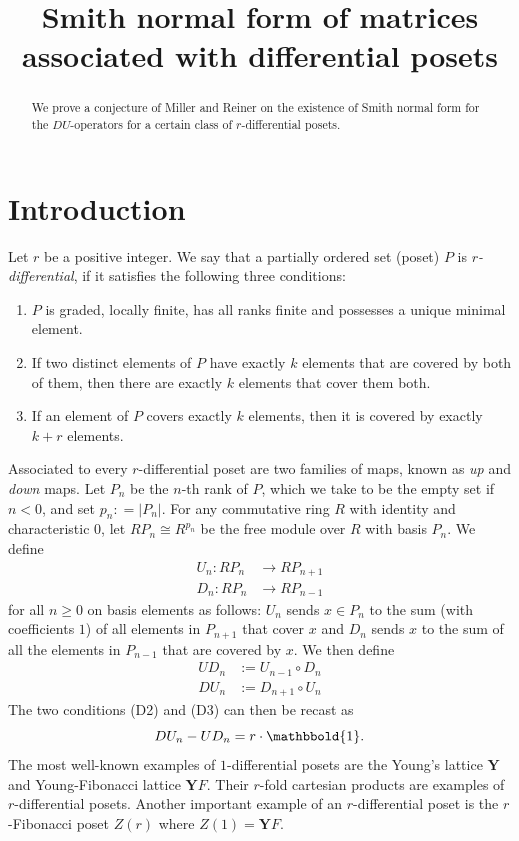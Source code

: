 \documentclass[ALCO, Unicode]{cedram}
\title
[Smith normal form for differential posets]
{Smith normal form of matrices associated with differential posets}
\author[\initial{S. W. A.} Shah]{\firstname{Syed Waqar Ali} \lastname{Shah}}
\begin{document}
\begin{abstract}
We prove a conjecture of Miller and Reiner on the existence of Smith normal form for the  $DU$-operators for a certain class of $r$-differential posets. 
\end{abstract}


\maketitle

\section{Introduction}           
Let $r$ be a positive integer. We say that a partially ordered     set (poset) $ P $ is \emph{$ r$-differential}, if it satisfies the following three conditions:    
\begin{enumerate} 
\item[(D1)]$P$ is graded, locally finite, has all ranks finite and possesses a unique minimal element.    
\item[(D2)]If two distinct elements of $P$ have exactly $k$ elements
that are covered by both of them, then there are  exactly $k$ elements
that cover them both.      
\item[(D3)] If an element of $P$ covers exactly  $k$ elements, then it is covered by exactly $k+r$  elements.                                             
\end{enumerate}
Associated to every $ r $-differential poset are two families of maps, known as \textit{up} and \textit{down} maps. Let $ P_{n} $ be the $ n$-th rank of $ P $, which we take to be the empty set if $ n < 0 $, and set $ p_{n} : = | P_{n} |$. For any commutative ring $ R$ with identity and characteristic $ 0 $, let $ 
RP_{n} \cong R^{p_{n}}$ be the free module over $ R $ with basis $ P_{n} $. We define 
$$
\begin{aligned}
U_n : RP_{n} & \rightarrow RP_{n+1}\\
D_n :  RP_{n}  & \rightarrow RP_{n-1}
\end{aligned}
$$
for all $ n \geq 0 $ on basis elements as follows:  $ U_{n} $ sends  $ x \in P_{n} $ to the sum (with coefficients $1$) of all elements in $ P_{n+1} $ that cover $ x $ and $ D_{n} $ sends $ x $ to the sum of all the elements in $ P_{n-1} $ that are covered by $ x $.  We then define
$$
\begin{aligned}
UD_n &:=U_{n-1} \circ D_n \\
DU_n &:=D_{n+1} \circ U_n
\end{aligned}
$$
The two conditions (D2) and (D3) can then be recast as 
$$    DU_{n}  -   UD_{n} = r \cdot \mathbbold{1} . $$ 
The most well-known examples of $ 1 $-differential posets are the Young's lattice $ \mathbf{Y} $ and Young-Fibonacci lattice $  \mathbf{Y}F $.  Their $ r $-fold cartesian products are examples of  $r$-differential posets. Another important example of an $ r$-differential poset is the $ r $-Fibonacci poset $ Z(r) $ where   $ Z(1) = \mathbf{Y} F$.   
\end{document}
